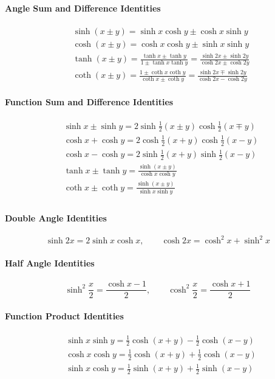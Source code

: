 \paragraph{Angle Sum and Difference Identities}
\begin{align*}
  &\sinh(x \pm y) = \sinh x \cosh y \pm \cosh x \sinh y \\
  &\cosh(x \pm y) = \cosh x \cosh y \pm \sinh x \sinh y \\
  &\tanh(x \pm y) = \frac{\tanh x \pm \tanh y}{1 \pm \tanh x \tanh y}
  = \frac{\sinh 2x \pm \sinh 2y}{\cosh 2x \pm \cosh 2y} \\
  &\coth(x \pm y) = \frac{1 \pm \coth x \coth y}{\coth x \pm \coth y}
  = \frac{\sinh 2x \mp \sinh 2y}{\cosh 2x - \cosh 2y}
\end{align*}

\paragraph{Function Sum and Difference Identities}
\begin{align*}
  &\sinh x \pm \sinh y = 2 \sinh \frac{1}{2}(x \pm y) 
  \cosh \frac{1}{2}(x \mp y) \\
  &\cosh x + \cosh y = 2 \cosh \frac{1}{2}(x+y) \cosh \frac{1}{2}(x-y) \\
  &\cosh x - \cosh y = 2 \sinh \frac{1}{2}(x+y) \sinh \frac{1}{2}(x-y) \\
  &\tanh x \pm \tanh y = \frac{\sinh(x \pm y)}{\cosh x \cosh y} \\
  &\coth x \pm \coth y = \frac{\sinh(x \pm y)}{\sinh x \sinh y} \\
\end{align*}


\paragraph{Double Angle Identities}
\[\sinh 2x = 2 \sinh x \cosh x, \qquad \cosh 2x = \cosh^2 x + \sinh^2 x \]


\paragraph{Half Angle Identities}
\[\sinh^2 \frac{x}{2} = \frac{\cosh x - 1}{2}, \qquad
\cosh^2 \frac{x}{2} = \frac{\cosh x + 1}{2} \]

\paragraph{Function Product Identities}
\begin{align*}
  &\sinh x \sinh y = \frac{1}{2} \cosh(x+y) - \frac{1}{2} \cosh(x-y) \\
  &\cosh x \cosh y = \frac{1}{2} \cosh(x+y) + \frac{1}{2} \cosh(x-y) \\
  &\sinh x \cosh y = \frac{1}{2} \sinh(x+y) + \frac{1}{2} \sinh(x-y) \\
\end{align*}

